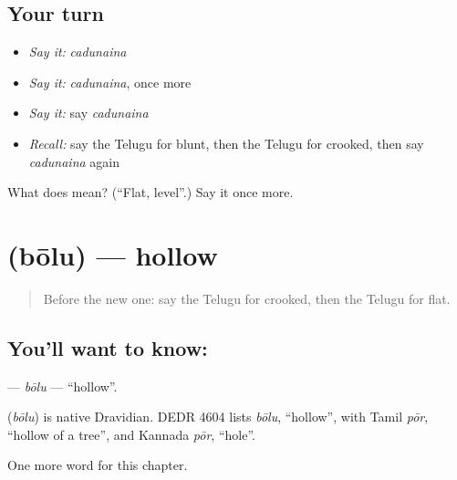 \subsection*{Your turn}
\begin{itemize}
\raggedright
  \item \emph{Say it:} \emph{cadunaina}
  \item \emph{Say it:} \emph{cadunaina}, once more
  \item \emph{Say it:} say \emph{cadunaina}
  \item \emph{Recall:} say the Telugu for blunt, then the Telugu for crooked, then say \emph{cadunaina} again
\end{itemize}

\begin{tcolorbox}[breakable,colback=teal!4,colframe=teal!35!black,title={Before you move on}]
What does  mean? (\textquotedblleft{}Flat, level\textquotedblright{}.) Say it once more.
\end{tcolorbox}
\section[\texorpdfstring{\te{బోలు} (bōlu)}{బోలు (bōlu)}]{ (bōlu) — hollow}

\label{lesson:TE-C298-bolu}



\begin{quote}
Before the new one: say the Telugu for crooked, then the Telugu for flat.
\end{quote}

\subsection*{You'll want to know: }
\textbf{} — \emph{bōlu} — \textquotedblleft{}hollow\textquotedblright{}.

\begin{cousinweb}
\textbf{} (\emph{bōlu}) is native Dravidian. DEDR 4604 lists \emph{bōlu}, \textquotedblleft{}hollow\textquotedblright{}, with Tamil \emph{pōr}, \textquotedblleft{}hollow of a tree\textquotedblright{}, and Kannada \emph{pōr}, \textquotedblleft{}hole\textquotedblright{}.
\end{cousinweb}

\begin{grammarlens}[title={What you've built}]
One more word for this chapter.
\end{grammarlens}

